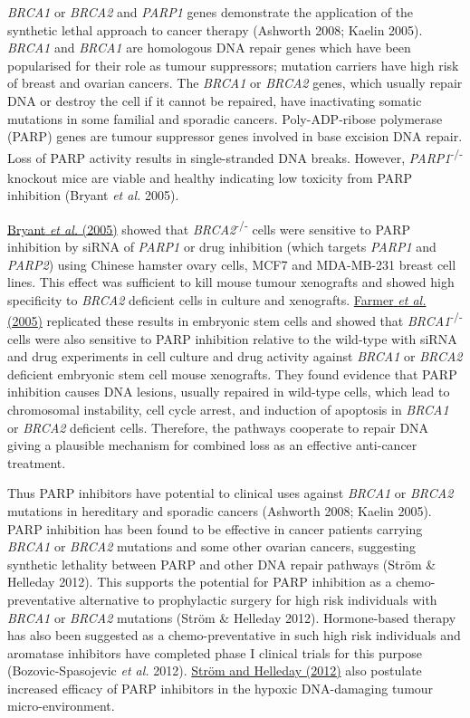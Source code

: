 \textit{BRCA1} or \textit{BRCA2} and \textit{PARP1} genes demonstrate the application of the synthetic lethal approach to cancer therapy (Ashworth 2008; Kaelin 2005). \textit{BRCA1} and \textit{BRCA1} are homologous DNA repair genes which have been popularised for their role as tumour suppressors; mutation carriers have high risk of breast and ovarian cancers. The \textit{BRCA1} or \textit{BRCA2} genes, which usually repair DNA or destroy the cell if it cannot be repaired, have inactivating somatic mutations in some familial and sporadic cancers. Poly-ADP-ribose polymerase (PARP) genes are tumour suppressor genes involved in base excision DNA repair. Loss of PARP activity results in single-stranded DNA breaks. However, \textit{PARP1}\textsuperscript{{}-/-}\textsubscript{ }knockout mice are viable and healthy indicating low toxicity from PARP inhibition (Bryant\textit{ et al.} 2005).  

\hyperlink{ENREF19}{Bryant}\hyperlink{ENREF19}{\textit{ et al.}}\hyperlink{ENREF19}{ (2005)} showed that \textit{BRCA2}\textsuperscript{{}-/-} cells were sensitive to PARP inhibition by siRNA of \textit{PARP1} or drug inhibition (which targets \textit{PARP1} and \textit{PARP2}) using Chinese hamster ovary cells, MCF7 and MDA-MB-231 breast cell lines. This effect was sufficient to kill mouse tumour xenografts and showed high specificity to \textit{BRCA2} deficient cells in culture and xenografts. \hyperlink{ENREF39}{Farmer}\hyperlink{ENREF39}{\textit{ et al.}}\hyperlink{ENREF39}{ (2005)} replicated these results in embryonic stem cells and showed that \textit{BRCA1}\textsuperscript{{}-/-} cells were also sensitive to PARP inhibition relative to the wild-type with siRNA and drug experiments in cell culture and drug activity against \textit{BRCA1} or \textit{BRCA2} deficient embryonic stem cell mouse xenografts. They found evidence that PARP inhibition causes DNA lesions, usually repaired in wild-type cells, which lead to chromosomal instability, cell cycle arrest, and induction of apoptosis in \textit{BRCA1} or \textit{BRCA2} deficient cells. Therefore, the pathways cooperate to repair DNA giving a plausible mechanism for combined loss as an effective anti-cancer treatment.  

Thus PARP inhibitors have potential to clinical uses against \textit{BRCA1} or \textit{BRCA2} mutations in hereditary and sporadic cancers (Ashworth 2008; Kaelin 2005). PARP inhibition has been found to be effective in cancer patients carrying \textit{BRCA1} or \textit{BRCA2} mutations and some other ovarian cancers, suggesting synthetic lethality between PARP and other DNA repair pathways (Str\"om \& Helleday 2012). This supports the potential for PARP inhibition as a chemo-preventative alternative to prophylactic surgery for high risk individuals with \textit{BRCA1} or \textit{BRCA2} mutations (Str\"om \& Helleday 2012). Hormone-based therapy has also been suggested as a chemo-preventative in such high risk individuals and aromatase inhibitors have completed phase I clinical trials for this purpose (Bozovic-Spasojevic\textit{ et al.} 2012). \hyperlink{ENREF91}{Str\"om and Helleday (2012)} also postulate increased efficacy of PARP inhibitors in the hypoxic DNA-damaging tumour micro-environment.  

